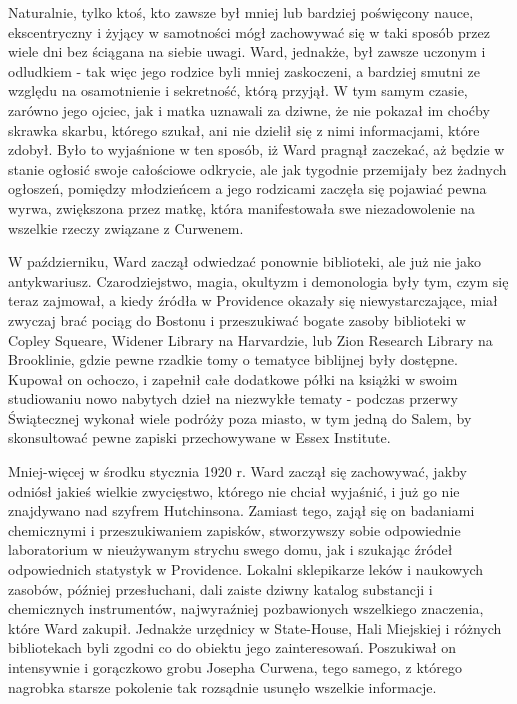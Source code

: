 Naturalnie, tylko ktoś, kto zawsze był mniej lub bardziej poświęcony nauce, ekscentryczny i żyjący w samotności mógł zachowywać się w taki sposób przez wiele dni bez ściągana na siebie uwagi. Ward, jednakże, był zawsze uczonym i odludkiem - tak więc jego rodzice byli mniej zaskoczeni, a bardziej smutni ze względu na osamotnienie i sekretność, którą przyjął. W tym samym czasie, zarówno jego ojciec, jak i matka uznawali za dziwne, że nie pokazał im choćby skrawka skarbu, którego szukał, ani nie dzielił się z nimi informacjami, które zdobył. Było to wyjaśnione w ten sposób, iż Ward pragnął zaczekać, aż będzie w stanie ogłosić swoje całościowe odkrycie, ale jak tygodnie przemijały bez żadnych ogłoszeń, pomiędzy młodzieńcem a jego rodzicami zaczęła się pojawiać pewna wyrwa, zwiększona przez matkę, która manifestowała swe niezadowolenie na wszelkie rzeczy związane z Curwenem.

W październiku, Ward zaczął odwiedzać ponownie biblioteki, ale już nie jako antykwariusz. Czarodziejstwo, magia, okultyzm i demonologia były tym, czym się teraz zajmował, a kiedy źródła w Providence okazały się niewystarczające, miał zwyczaj brać pociąg do Bostonu i przeszukiwać bogate zasoby biblioteki w Copley Squeare, Widener Library na Harvardzie, lub Zion Research Library na Brooklinie, gdzie pewne rzadkie tomy o tematyce biblijnej były dostępne. Kupował on ochoczo, i zapełnił całe dodatkowe półki na książki w swoim studiowaniu nowo nabytych dzieł na niezwykłe tematy - podczas przerwy Świątecznej wykonał wiele podróży poza miasto, w tym jedną do Salem, by skonsultować pewne zapiski przechowywane w Essex Institute.

Mniej-więcej w środku stycznia 1920 r. Ward zaczął się zachowywać, jakby odniósł jakieś wielkie zwycięstwo, którego nie chciał wyjaśnić, i już go nie znajdywano nad szyfrem Hutchinsona. Zamiast tego, zajął się on badaniami chemicznymi i przeszukiwaniem zapisków, stworzywszy sobie odpowiednie laboratorium w nieużywanym strychu swego domu, jak i szukając źródeł odpowiednich statystyk w Providence. Lokalni sklepikarze leków i naukowych zasobów, później przesłuchani, dali zaiste dziwny katalog substancji i chemicznych instrumentów, najwyraźniej pozbawionych wszelkiego znaczenia, które Ward zakupił. Jednakże urzędnicy w State-House, Hali Miejskiej i różnych bibliotekach byli zgodni co do obiektu jego zainteresowań. Poszukiwał on intensywnie i gorączkowo grobu Josepha Curwena, tego samego, z którego nagrobka starsze pokolenie tak rozsądnie usunęło wszelkie informacje. 

